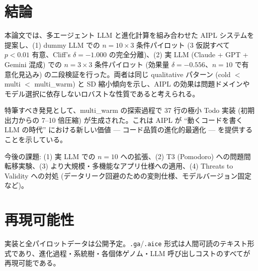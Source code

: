 \documentclass[a4paper,11pt]{ltjsarticle}
\begin{document}
\section{結論}

本論文では、多エージェント LLM と進化計算を組み合わせた AIPL システムを提案し、(1) dummy LLM での $n=10 \times 3$ 条件パイロット (3 仮説すべて $p < 0.01$ 有意、Cliff's $\delta = -1.000$ の完全分離)、(2) 実 LLM (Claude + GPT + Gemini 混成) での $n=3 \times 3$ 条件パイロット (効果量 $\delta = -0.556$、$n=10$ で有意化見込み) の二段検証を行った。両者は同じ qualitative パターン (cold $<$ multi $<$ multi\_warm) と SD 縮小傾向を示し、AIPL の効果は問題ドメインやモデル選択に依存しないロバストな性質であると考えられる。

特筆すべき発見として、multi\_warm の探索過程で 37 行の極小 Todo 実装 (初期出力からの 7--10 倍圧縮) が生成された。これは AIPL が ``動くコードを書く LLM の時代'' における新しい価値 — コード品質の進化的最適化 — を提供することを示している。

今後の課題: (1) 実 LLM での $n=10$ への拡張、(2) T3 (Pomodoro) への問題間転移実験、(3) より大規模・多機能なアプリ仕様への適用、(4) Threats to Validity への対処 (データリーク回避のための変則仕様、モデルバージョン固定など)。

\section*{再現可能性}

実装と全パイロットデータは公開予定。\texttt{.ga}/\texttt{.aice} 形式は人間可読のテキスト形式であり、進化過程・系統樹・各個体ゲノム・LLM 呼び出しコストのすべてが再現可能である。



\end{document}
